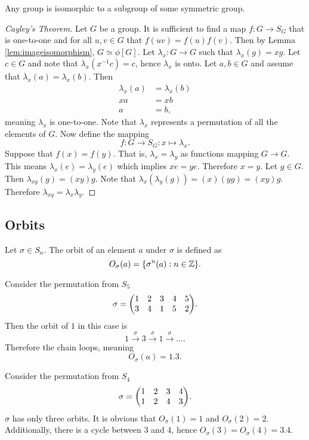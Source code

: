 \documentclass[../notes.tex]{subfiles}
\begin{document}
\begin{theorem}
	Any group is isomorphic to a subgroup of some symmetric group.
\end{theorem}
\begin{proof}[Cayley's Theorem]
	Let $G$ be a group. It is sufficient to find a map $f : G \to S_G$ that is one-to-one and for all $u,v \in G$ that $f(uv) = f(u) f(v)$. Then by Lemma \ref{lem:imageisomorphism}, $G \simeq \phi[G]$. Let $\lambda_x : G \to G$ such that $\lambda_x (g) = xg$. Let $c \in G$ and note that $\lambda_x (x^{-1} c) = c$, hence $\lambda_x$ is onto. Let $a,b \in G$ and assume that $\lambda_x (a) = \lambda_x(b)$. Then
	\begin{align*}
		\lambda_x (a) &= \lambda_x (b) \\
		xa &= xb \\
		a &= b
	,\end{align*}
	meaning $\lambda_x$ is one-to-one. Note that $\lambda_x$ represents a permutation of all the elements of $G$. Now define the mapping
	\[
		f : G \to S_G : x \mapsto \lambda_x
	.\]
	Suppose that $f(x) = f(y)$. That is, $\lambda_x = \lambda_y$ as functions mapping $G \to G$. This means $\lambda_x (e) = \lambda_y (e)$ which implies $xe = ye$. Therefore $x = y$. Let $g \in G$. Then $\lambda_{xy} (g) = (xy)g$. Note that $\lambda_x(\lambda_y(g)) = (x)(yg) = (xy)g$. Therefore $\lambda_{xy} = \lambda_x \lambda_y$.
\end{proof}

\subsection*{Orbits}
\begin{definition}[Orbit]
	Let $\sigma \in S_n$. The orbit of an element $a$ under $\sigma$ is defined as
	\[
		O_\sigma (a) = \qty{\sigma^n(a) : n \in \mathbb{Z}}
	.\]
\end{definition}
\begin{example}
	Consider the permutation from $S_5$
	\[
		\sigma = \mqty(1 & 2 & 3 & 4 & 5 \\ 3 & 4 & 1 & 5 & 2)
	.\]
	Then the orbit of $1$ in this case is
	\[
		1 \overset{\sigma}{\longrightarrow} 3 \overset{\sigma}{\longrightarrow} 1 \overset{\sigma}{\longrightarrow} \ldots
	.\]
	Therefore the chain loops, meaning
	\[
		O_\sigma (a) = \qty{1,3}
	.\]
\end{example}

\begin{example}
	Consider the permutation from $S_4$
	\[
		\sigma = \mqty(1 & 2 & 3 & 4 \\ 1 & 2 & 4 & 3)
	.\]
	$\sigma$ has only three orbits. It is obvious that $O_\sigma(1) = \qty{1}$ and $O_\sigma(2) = \qty{2}$. Additionally, there is a cycle between $3$ and $4$, hence $O_\sigma(3) = O_\sigma(4) = \qty{3,4}$.
\end{example}
\end{document}
